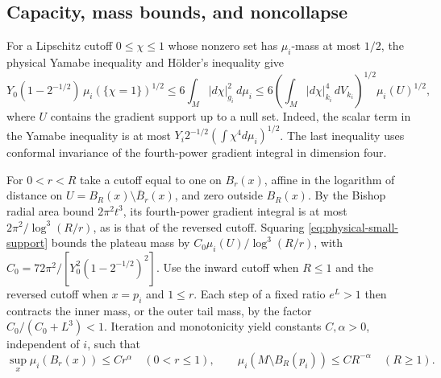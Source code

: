 \subsection{Capacity, mass bounds, and noncollapse}

For a Lipschitz cutoff \(0\leq\chi\leq1\) whose nonzero set has
\(\mu_i\)-mass at most \(1/2\), the physical Yamabe inequality and
H\"older's inequality give
\begin{equation}\label{eq:physical-small-support}
 Y_0(1-2^{-1/2})\,\mu_i(\{\chi=1\})^{1/2}
 \leq 6\int_M |d\chi|_{g_i}^2\,d\mu_i
 \leq 6\left(\int_M |d\chi|_{k_i}^4\,dV_{k_i}\right)^{1/2}
        \mu_i(U)^{1/2},
\end{equation}
where \(U\) contains the gradient support up to a null set. Indeed,
the scalar term in the Yamabe inequality is at most
\(Y_i2^{-1/2}(\int\chi^4d\mu_i)^{1/2}\). The last inequality uses
conformal invariance of the fourth-power gradient integral in
dimension four.

For \(0<r<R\) take a cutoff equal to one on \(B_r(x)\), affine in
the logarithm of distance on \(U=B_R(x)\setminus\overline B_r(x)\),
and zero outside \(B_R(x)\). By the Bishop radial area bound
\(2\pi^2t^3\), its fourth-power gradient integral is at most
\(2\pi^2/\log^3(R/r)\), as is that of the reversed cutoff. Squaring
\eqref{eq:physical-small-support} bounds the plateau mass by
\(C_0\mu_i(U)/\log^3(R/r)\), with
\(C_0=72\pi^2/[Y_0^2(1-2^{-1/2})^2]\). Use the inward cutoff when
\(R\leq1\) and the reversed cutoff when \(x=p_i\) and \(1\leq r\).
Each step of a fixed ratio \(e^L>1\) then contracts the inner mass,
or the outer tail mass, by the factor \(C_0/(C_0+L^3)<1\).
Iteration and monotonicity yield constants \(C,\alpha>0\), independent
of \(i\), such that
\begin{equation}\label{eq:physical-power}
 \sup_x\mu_i(B_r(x))\leq C r^\alpha\quad(0<r\leq1),\qquad
 \mu_i(M\setminus B_R(p_i))\leq C R^{-\alpha}\quad(R\geq1).
\end{equation}

